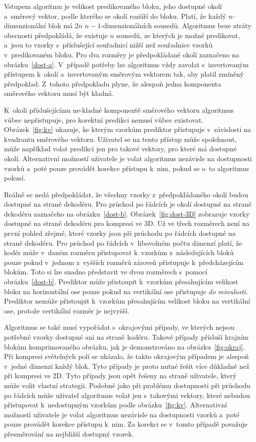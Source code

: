 Vstupem algoritmu je velikost pre\-dikovaného bloku, jeho dostupné okolí a~směr\-ový vektor, podle kterého se okolí rozšíří do bloku.
Platí, že každý $n$-dimenzionální blok má $2n$ $n-1$-dimenzionálních sousedů.
Algoritmus beze ztráty obecnosti předpokládá, že existuje $n$ sousedů, ze kterých je možné pre\-dikovat, a~jsou to vzorky s~příslušející souřadnicí nižší než souřadnice vzorků v~pre\-dikovaném bloku.
Pro dva roz\-měry je předpokládané okolí zaznačeno na obrázku~\ref{dost-a}.
V~případě potřeby lze algoritmus vždy zavolat s~invertovaným přístupem k~okolí a~invertovaným směr\-ovým vektorem tak, aby platil zmíněný předpoklad.
Z~tohoto předpokladu plyne, že alespoň jedna komponenta směr\-ového vektoru musí být kladná.

K~okolí příslušejícímu ne-kladné komponentě směr\-ového vektoru algoritmus vůbec nepřistupuje, pro korektní pre\-dikci nemusí vůbec existovat.
Obrázek~\ref{fig:kv} ukazuje, ke kterým vzorkům pre\-diktor přistupuje v~zá\-vislosti na kvadrantu směr\-ového vektoru.
Uživatel se na tento přístup může spolehnout, může například volat pre\-dikci jen pro takové vektory, pro které má dostupné okolí.
Alternativní možností uživatele je volat algoritmus nezá\-visle na dostupnosti vzorků a~poté pouze provádět korekce přístupu k~nim, pokud se o~to algoritmus pokusí.

Reálně se nedá předpokládat, že všechny vzorky z~předpokládaného okolí budou dostupné na straně dekodéru.
Pro průchod po řádcích je okolí dostupné na straně dekodéru zaznačeho na obrázku~\ref{dost-b}.
Obrázek~\ref{fig:dost-3D} zobrazuje vzorky dostupné na straně dekodéru pro kom\-pre\-si ve 3D.
Už ve třech roz\-měrech není na první po\-hled zřejmé, které vzorky jsou při průchodu po řádcích dostupné na straně dekodéru.
Pro průchod po řádcích v~libovolném počtu dimenzí platí, že kodér může v~daném roz\-měru přistupovat k~vzorkům z~následujících bloků pouze pokud v~jednom z~vyšších roz\-měrů zároveň přistupuje k~předcházejícím blokům.
Toto si lze snadno představit ve dvou roz\-měrech s~pomocí obrázku~\ref{dost-b}.
Prediktor může přistoupit k~vzorkům přesahujícím velikost bloku na horizontální ose pouze pokud na vertikální ose přistupuje \textit{do minulosti}.
Prediktor nemůže přistoupit k~vzorkům přesahujícím velikost bloku na vertikální ose, protože vertikální roz\-měr je nejvyšší.

Algoritmus se také musí vypořádat s~okrajovými případy, ve kterých nejsou potřebné vzorky dostupné ani na straně kodéru.
Takové případy přísluší krajním blokům komprimovaného obrázku, jak je demonstrováno na obrázku~\ref{fig:okraj}.
Při kom\-pre\-si světelných polí se ukázalo, že takto okrajovým případem je alespoň v~jedné dimenzi každý blok.
Tyto případy je proto nutné řešit více důkladně než při kom\-pre\-si ve 2D.
Tyto případy jsou opět řešeny na straně uživatele, který může volit vlastní strategii.
Podobně jako při problému dostupnosti při průchodu po řádcích může uživatel algoritmus volat jen s~takovými vektory, které nebudou přistupovat k~nedostupným vzorkům podle obrázku~\ref{fig:kv}.
Alternativní možností uživatele je volat algoritmus nezá\-visle na dostupnosti vzorků a~poté pouze provádět korekce přístupu k~nim.
Za korekci se v~tomto případě považuje přesměr\-ování na nejbližší dostupný vzorek.


